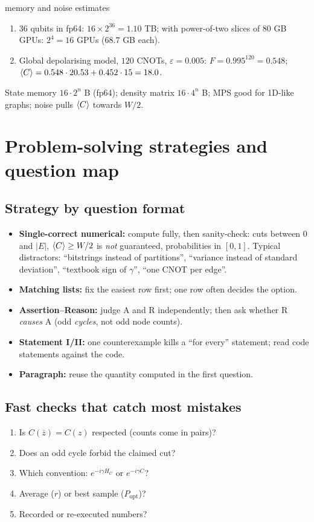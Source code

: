 \documentclass[11pt,a4paper,openany]{book}
\newcounter{wex}[chapter]
\newenvironment{steps}{\begin{enumerate}[label=\textbf{Step \arabic*.}, leftmargin=4.2em, itemsep=2pt]}{\end{enumerate}}
\begin{document}
\begin{wexample}{memory and noise estimates}
\begin{steps}
\item 36 qubits in fp64: $16\times2^{36} = 1.10$ TB; with power-of-two slices of 80 GB GPUs: $2^4 = 16$ GPUs ($68.7$ GB each).
\item Global depolarising model, $120$ CNOTs, $\varepsilon = 0.005$: $F = 0.995^{120} = 0.548$; $\braket C = 0.548\cdot20.53 + 0.452\cdot15 = 18.0$.
\end{steps}
\end{wexample}
\begin{checklist}
State memory $16\cdot2^n$ B (fp64); density matrix $16\cdot4^n$ B; MPS good for 1D-like graphs; noise pulls $\braket C$ towards $W/2$.
\end{checklist}

\section{Problem-solving strategies and question map}
\subsection{Strategy by question format}
\begin{itemize}[itemsep=3pt]
\item \textbf{Single-correct numerical:} compute fully, then sanity-check: cuts between $0$ and $|E|$, $\braket C \ge W/2$ is \emph{not} guaranteed, probabilities
      in $[0, 1]$. Typical distractors: ``bitstrings instead of partitions'', ``variance instead of standard deviation'', ``textbook sign of $\gamma$'',
      ``one CNOT per edge''.
\item \textbf{Matching lists:} fix the easiest row first; one row often decides the option.
\item \textbf{Assertion--Reason:} judge A and R independently; then ask whether R \emph{causes} A (odd \emph{cycles}, not odd node counts).
\item \textbf{Statement I/II:} one counterexample kills a ``for every'' statement; read code statements against the code.
\item \textbf{Paragraph:} reuse the quantity computed in the first question.
\end{itemize}
\subsection{Fast checks that catch most mistakes}
\begin{enumerate}[itemsep=2pt]
\item Is $C(\bar z) = C(z)$ respected (counts come in pairs)?
\item Does an odd cycle forbid the claimed cut?
\item Which convention: $e^{-i\gamma H_C}$ or $e^{-i\gamma C}$?
\item Average ($r$) or best sample ($P_{\text{opt}}$)?
\item Recorded or re-executed numbers?
\end{enumerate}
\end{document}
